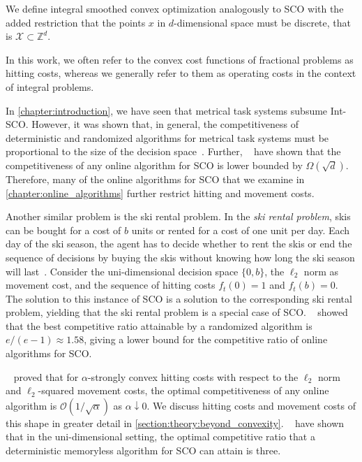 \begin{problem}
We define integral smoothed convex optimization analogously to SCO with the added restriction that the points $x$ in $d$-dimensional space must be discrete, that is $\mathcal{X} \subset \mathbb{Z}^d$.
\end{problem}

In this work, we often refer to the convex cost functions of fractional problems as hitting costs, whereas we generally refer to them as operating costs in the context of integral problems.

In \cref{chapter:introduction}, we have seen that metrical task systems subsume Int-SCO. However, it was shown that, in general, the competitiveness of deterministic and randomized algorithms for metrical task systems must be proportional to the size of the decision space~\cite{Blum1992, Borodin1992}. Further, \citeauthor*{Chen2018}~\cite{Chen2018} have shown that the competitiveness of any online algorithm for SCO is lower bounded by $\Omega(\sqrt{d})$. Therefore, many of the online algorithms for SCO that we examine in \cref{chapter:online_algorithms} further restrict hitting and movement costs.

Another similar problem is the ski rental problem. In the \emph{ski rental problem}, skis can be bought for a cost of $b$ units or rented for a cost of one unit per day. Each day of the ski season, the agent has to decide whether to rent the skis or end the sequence of decisions by buying the skis without knowing how long the ski season will last~\cite{Shah2021}. Consider the uni-dimensional decision space $\{0,b\}$, the $\ell_2$ norm as movement cost, and the sequence of hitting costs $f_t(0) = 1$ and $f_t(b) = 0$. The solution to this instance of SCO is a solution to the corresponding ski rental problem, yielding that the ski rental problem is a special case of SCO. \citeauthor*{Karlin1990}~\cite{Karlin1990} showed that the best competitive ratio attainable by a randomized algorithm is $e/(e-1) \approx 1.58$, giving a lower bound for the competitive ratio of online algorithms for SCO.

\citeauthor*{Goel2019}~\cite{Goel2019} proved that for $\alpha$-strongly convex hitting costs with respect to the $\ell_2$ norm and $\ell_2$-squared movement costs, the optimal competitiveness of any online algorithm is $\mathcal{O}(1/\sqrt{\alpha})$ as $\alpha \downarrow 0$. We discuss hitting costs and movement costs of this shape in greater detail in \cref{section:theory:beyond_convexity}. \citeauthor*{Bansal2015}~\cite{Bansal2015} have shown that in the uni-dimensional setting, the optimal competitive ratio that a deterministic memoryless algorithm for SCO can attain is three.

